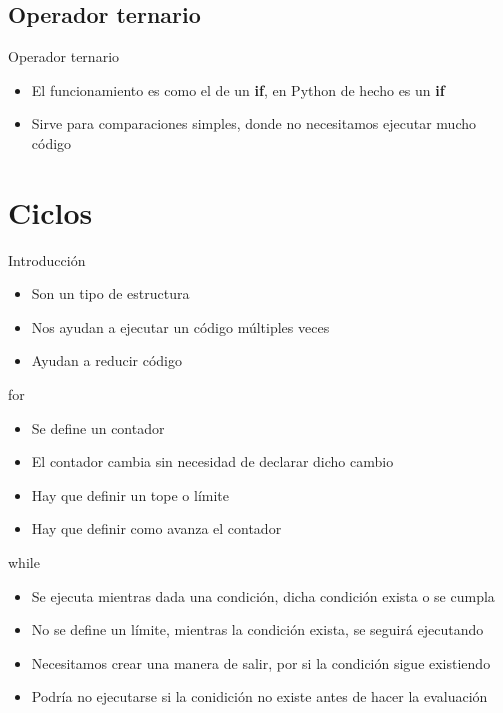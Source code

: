 \documentclass{beamer}
\begin{document}
\subsection{Operador ternario}

\begin{frame}{Operador ternario}
    \begin{itemize}
        \item El funcionamiento es como el de un \textbf{if}, en Python de hecho es un \textbf{if}
        \item Sirve para comparaciones simples, donde no necesitamos ejecutar mucho c\'odigo
    \end{itemize}
\end{frame}

\section{Ciclos}

\begin{frame}{Introducci\'on}
    \begin{itemize}
        \item Son un tipo de estructura
        \item Nos ayudan a ejecutar un c\'odigo m\'ultiples veces
        \item Ayudan a reducir c\'odigo
    \end{itemize}
\end{frame}

\begin{frame}{for}
    \begin{itemize}
        \item Se define un contador
        \item El contador cambia sin necesidad de declarar dicho cambio
        \item Hay que definir un tope o l\'imite
        \item Hay que definir como avanza el contador
    \end{itemize}
\end{frame}


\begin{frame}{while}
    \begin{itemize}
        \item Se ejecuta mientras dada una condici\'on, dicha condici\'on exista o se cumpla
        \item No se define un l\'imite, mientras la condici\'on exista, se seguir\'a ejecutando 
        \item Necesitamos crear una manera de salir, por si la condici\'on sigue existiendo
        \item Podr\'ia no ejecutarse si la conidici\'on no existe antes de hacer la evaluaci\'on
    \end{itemize}
\end{frame}
\end{document}
